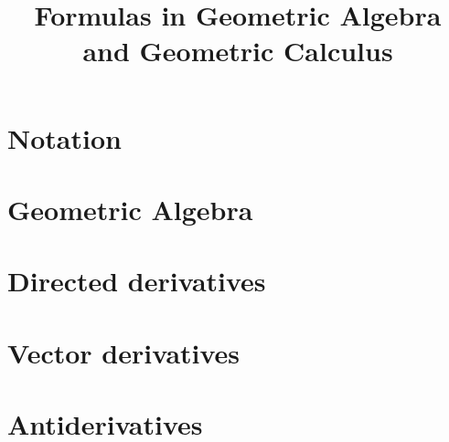 \documentclass[a4paper,12pt]{article}
\title{Formulas in Geometric Algebra and Geometric Calculus}
\author{}
\begin{document}
\maketitle

\section{Notation}

\section{Geometric Algebra}

\section{Directed derivatives}

\section{Vector derivatives}

\section{Antiderivatives}


\printbibliography[heading=bibintoc, title={References}]
\end{document}
